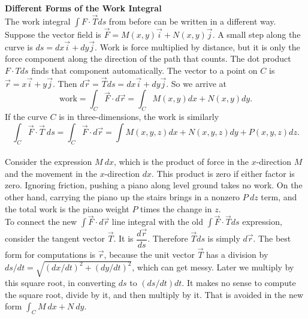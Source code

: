 \noindent\textbf{\large Different Forms of the Work Integral}\\

The work integral $\int F \cdot \vec T ds$ from before can be written in a different way. Suppose the vector field is $\vec F = M(x,y) \vec i + N(x,y) \vec j$.
A small step along the curve is $ds = dx \vec i + dy \vec j$. Work is force multiplied by distance, but it is only the force component along the direction of the path that counts. The dot product $F\cdot T ds$ finds that component automatically.  The vector to a point on $C$ is $\vec r = x\vec i + y\vec j$. Then $d\vec r = \vec T ds = dx \vec i + dy \vec j$.  So we arrive at
$$\text{work} = \int_C \vec F \cdot d\vec r = \int_C M(x,y) dx + N(x,y) dy.$$
If the curve $C$ is in three-dimensions, the work is similarly
$$\int_C \vec F \cdot \vec T \: ds = \int_C \vec F \cdot d \vec r = \int M(x,y,z) dx+N(x,y,z) dy +P(x,y,z) dz.$$\\

Consider the expression $M \: dx$, which is the product of force in the $x$-direction $M$ and  the movement in the $x$-direction $dx$. This product is zero if either factor is zero. Ignoring friction, pushing a piano along level ground takes no work. On the other hand, carrying the piano up the stairs brings in a nonzero $P \: dz$ term, and the total work is the piano weight $P$ times the change in $z$.\\

To connect the new $\int \vec F \cdot d\vec r$ line integral with the old $\int \vec F \cdot \vec T ds$ expression, consider the tangent vector $\vec T$. It is $\dfrac{d \vec r}{ds}$. Therefore $\vec T ds$ is simply $d\vec r$. The best form for computations is $\vec r$, because the
unit vector $\vec T$ has a division by $ds/dt = \sqrt{(dx/dt)^2 + (dy/dt)^2}$, which can get messy. Later we multiply by this square root, in converting $ds$ to $(ds/dt)dt$. It makes no sense to compute the square root, divide by it, and then multiply by it. That is avoided in the new form
$\int_C M \: dx + N \: dy$.\\


